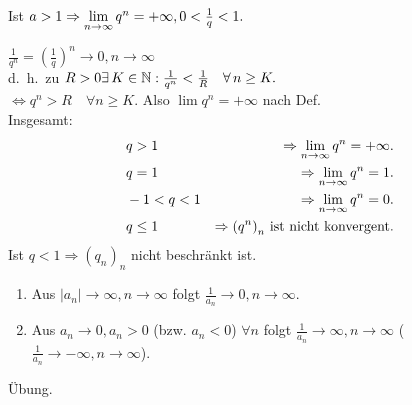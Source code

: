 \documentclass[../ana1.tex]{subfiles}
\begin{document}
\begin{bsp}
	Ist \(a>1 \Rightarrow \lim\limits_{n\rightarrow\infty}q^n = +\infty, 0< \frac{1}{q} < 1. \)
\end{bsp}
\begin{bew}
	\( \frac{1}{q^n} = {\left( \frac{1}{q} \right)}^n \rightarrow 0, n\rightarrow \infty \) \\
	d.\ h.\ zu \(R>0 \exists K\in\N: \frac{1}{q^n} < \frac{1}{R} \quad \forall n\geq K. \) \\
	\( \Leftrightarrow q^n > R \quad \forall n\geq K. \) Also \(\lim q^n = +\infty \) nach Def.\\
	Insgesamt: 
	\begin{align*}
		&q>1 &\Rightarrow \lim\limits_{n\rightarrow\infty}q^n = +\infty.\\
		&q=1 &\Rightarrow \lim\limits_{n\rightarrow\infty}q^n = 1.\\
		&-1<q<1 & \Rightarrow \lim\limits_{n\rightarrow\infty} q^n = 0.\\
		&q\leq 1 & \Rightarrow {(q^n)}_n \text{ ist nicht konvergent.}
	\end{align*}
	Ist \( q<1 \Rightarrow {(q_n)}_n \) nicht beschränkt ist.
\end{bew}

\begin{satz}[Kehrwerte]
	\begin{enumerate}
		\item Aus \( |a_n| \rightarrow \infty, n\rightarrow\infty \) folgt \(\frac{1}{a_n} \rightarrow0,n\rightarrow\infty \).
		\item Aus \( a_n\rightarrow 0, a_n > 0 \) (bzw. \(a_n<0\)) \( \forall n \) folgt \( \frac{1}{a_n} \rightarrow\infty, n\rightarrow\infty \) (\( \frac{1}{a_n} \rightarrow -\infty, n\rightarrow\infty \)).
	\end{enumerate}
\end{satz}
\begin{bew}\phantom{\qedhere}
	Übung.
\end{bew}
\end{document}
